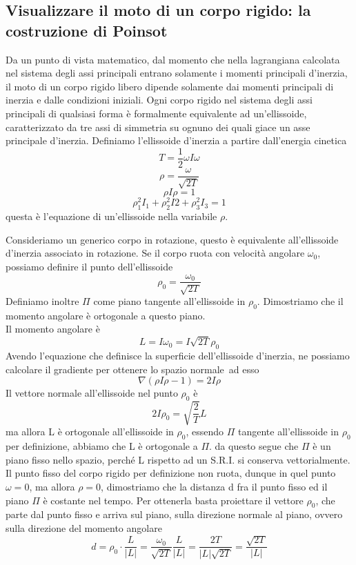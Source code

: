 \documentclass[
10pt, %
a4paper, %
oneside, %
headinclude,footinclude, %
BCOR5mm, %
]{scrartcl}
\begin{document}
\subsection{Visualizzare il moto di un corpo rigido: la costruzione di Poinsot}
\begin{definizione}
	Da un punto di vista matematico, dal momento che nella lagrangiana calcolata nel sistema degli assi principali entrano solamente i momenti principali d'inerzia, il moto di un corpo rigido libero dipende solamente dai momenti principali di inerzia e dalle condizioni iniziali. Ogni corpo rigido nel sistema degli assi principali di qualsiasi forma è formalmente equivalente ad un'ellissoide, caratterizzato da tre assi di simmetria su ognuno dei quali giace un asse principale d'inerzia. Definiamo l'ellissoide d'inerzia a partire dall'energia cinetica 
	\[T = \frac{1}{2}\omega I\omega\]
	\[\rho= \frac{\omega}{\sqrt{2T}}\]
	\[\rho I \rho = 1\]
	\[\rho_1^2I_1+\rho_2^2I2+\rho_3^2I_3 = 1\]
	questa è l'equazione di un'ellissoide nella variabile $\rho$.
\end{definizione}
Consideriamo un generico corpo in rotazione, questo è equivalente all'ellissoide d'inerzia associato in rotazione.
Se il corpo ruota con velocità angolare $\omega_0$, possiamo definire il punto dell'ellissoide
\[\rho_0 = \frac{\omega_0}{\sqrt{2T}}\]
Definiamo inoltre $\Pi$ come piano tangente all'ellissoide in $\rho_0$. Dimostriamo che il momento angolare è ortogonale a questo piano.\\
Il momento angolare è
\[L = I\omega_0 = I\sqrt{2T}\rho_0\]
Avendo l'equazione che definisce la superficie dell'ellissoide d'inerzia, ne possiamo calcolare il gradiente per ottenere lo spazio normale\ ad esso
\[\nabla(\rho I \rho - 1) = 2I\rho\]
Il vettore normale all'ellissoide nel punto $\rho_0$ è
\[2I\rho_0  = \sqrt{\frac{2}{T}}L\]
ma allora L è ortogonale all'ellissoide in $\rho_0$, essendo $\Pi$ tangente all'ellissoide in $\rho_0$ per definizione, abbiamo che L è ortogonale a $\Pi$. da questo segue che $\Pi$ è un piano fisso nello spazio, perché L rispetto ad un S.R.I. si conserva vettorialmente.\\
Il punto fisso del corpo rigido per definizione non ruota, dunque in quel punto $\omega = 0$, ma allora \(\rho = 0 \), dimostriamo che la distanza d fra il punto fisso ed il piano $\Pi$ è costante nel tempo. Per ottenerla basta proiettare il vettore $\rho_0$, che parte dal punto fisso e arriva sul piano, sulla direzione normale al piano, ovvero sulla direzione del momento angolare
\[d = \rho_0\cdot\frac{L}{|L|} = \frac{\omega_0}{\sqrt{2 T}}\frac{L}{|L|} = \frac{2T}{|L|\sqrt{2T}} = \frac{\sqrt{2T}}{|L|}\]
\end{document}
